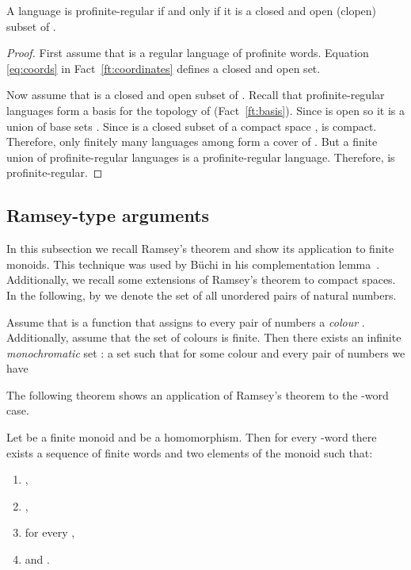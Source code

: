 \documentclass{LMCS}
\begin{document}
\begin{fact}\label{ft:clopen}
A language  is profinite-regular if and only if it is a closed and open (clopen) subset of .
\end{fact}

\begin{proof}
First assume that  is a regular language of profinite words. Equation \eqref{eq:coords} in Fact~\ref{ft:coordinates} defines a closed and open set.

Now assume that  is a closed and open subset of . Recall that profinite-regular languages form a basis for the topology of  (Fact~\ref{ft:basis}). Since  is open so it is a union of base sets . Since  is a closed subset of a compact space ,  is compact. Therefore, only finitely many languages among  form a cover of . But a finite union of profinite-regular languages is a profinite-regular language. Therefore,  is profinite-regular.
\end{proof}

\subsection{Ramsey-type arguments}

In this subsection we recall Ramsey's theorem and show its application to finite monoids. This technique was used by B\"uchi in his complementation lemma~\cite{buchi_decision}. Additionally, we recall some extensions of Ramsey's theorem to compact spaces. In the following, by  we denote the set of all unordered pairs of natural numbers.

\begin{theorem}[Ramsey]\label{th:ramsey}
Assume that  is a function that assigns to every pair of numbers  a \emph{colour} . Additionally, assume that the set of colours  is finite. Then there exists an infinite \emph{monochromatic} set : a set  such that for some colour  and every pair of numbers  we have

\end{theorem}

The following theorem shows an application of Ramsey's theorem to the -word case.

\begin{theorem}\label{th:ramsey_decomposition}
Let  be a finite monoid and  be a homomorphism. Then for every -word  there exists a sequence of finite words  and two elements  of the monoid  such that:
\begin{enumerate}[label=(\roman*)]
\item ,
\item ,
\item  for every ,
\item  and .
\end{enumerate}
\end{theorem}
\end{document}
